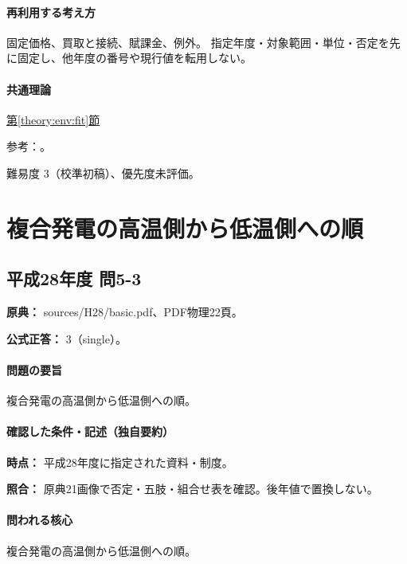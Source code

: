 \paragraph{再利用する考え方} 固定価格、買取と接続、賦課金、例外。 指定年度・対象範囲・単位・否定を先に固定し、他年度の番号や現行値を転用しない。

\paragraph{共通理論} \hyperref[theory:env:fit]{第\ref*{theory:env:fit}節}

\par 参考：\cite{env58_fit2013}。

\par 難易度 3（校準初稿）、優先度未評価。

\section{複合発電の高温側から低温側への順}

\subsection{平成28年度 問5-3}
\label{q:h28-reg-basic-5-3}

\noindent\textbf{原典：} sources/H28/basic.pdf、PDF物理22頁。

\textbf{公式正答：} 3（single）。

\paragraph{問題の要旨} 複合発電の高温側から低温側への順。

\paragraph{確認した条件・記述（独自要約）}\mbox{}\par

\noindent\textbf{時点：} 平成28年度に指定された資料・制度。\par

\noindent\textbf{照合：} 原典21画像で否定・五肢・組合せ表を確認。後年値で置換しない。\par

\paragraph{問われる核心} 複合発電の高温側から低温側への順。

